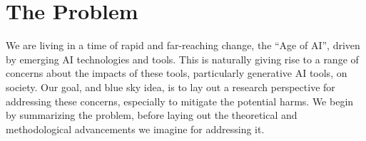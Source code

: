 \section{The Problem}
\label{sec:problem}


We are living in a time of rapid and far-reaching change, the ``Age of AI'', driven by emerging AI technologies and tools. This is naturally 
giving rise to a range of concerns about the impacts of these tools, particularly generative AI tools, on society. Our goal, and blue sky idea, 
is to lay out a research perspective for addressing these concerns, especially to mitigate the potential harms. We begin by summarizing 
the problem, before laying out the theoretical and methodological advancements we imagine for addressing it. 

